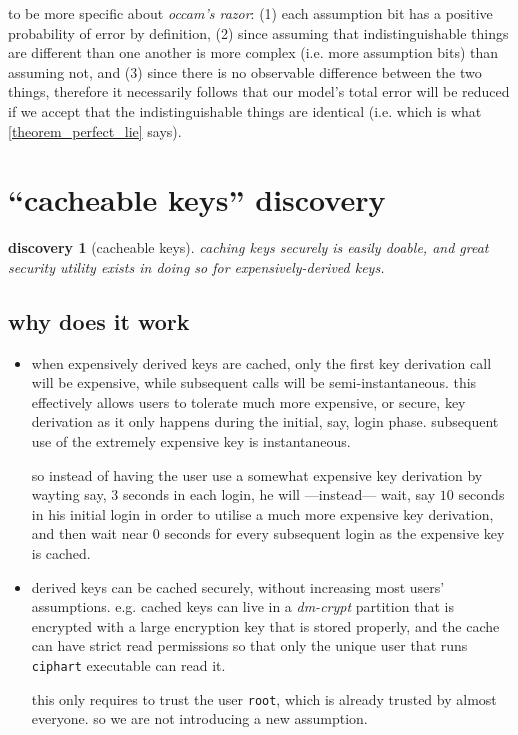 \documentclass[twocolumn]{article}
\newtheorem{discovery}{discovery}
\begin{document}
to be more specific about \emph{occam's razor}: (1) each assumption bit has
a positive probability of error by definition, (2) since assuming that
indistinguishable things are different than one another is more complex
(i.e. more assumption bits) than assuming not, and (3) since there is no
observable difference between the two things, therefore it necessarily
follows that our model's total error will be reduced if we accept that the
indistinguishable things are identical (i.e.  which is what
\cref{theorem_perfect_lie} says).

\section{``cacheable keys'' discovery}
\begin{discovery}[cacheable keys]\label{discov_key_caching}
    caching keys securely is easily doable, and great security utility
    exists in doing so for expensively-derived keys.
\end{discovery}

\subsection{why does it work}
\begin{itemize}
    \item when expensively derived keys are cached, only the first key
    derivation call will be expensive, while subsequent calls will be
    semi-instantaneous.  this effectively allows users to tolerate much
    more expensive, or secure, key derivation as it only happens during the
    initial, say, login phase.  subsequent use of the extremely expensive
    key is instantaneous.

    so instead of having the user use a somewhat expensive key derivation
    by wayting say, $3$ seconds in each login, he will ---instead--- wait,
    say $10$ seconds in his initial login in order to utilise a much more
    expensive key derivation, and then wait near $0$ seconds for every
    subsequent login as the expensive key is cached.

    \item derived keys can be cached securely, without increasing most
    users' assumptions.  e.g. cached keys can live in a \emph{dm-crypt}
    partition that is encrypted with a large encryption key that is stored
    properly, and the cache can have strict read permissions so that only
    the unique user that runs \texttt{ciphart} executable can read it.

    this only requires to trust the user \texttt{root}, which is already
    trusted by almost everyone.  so we are not introducing a new
    assumption.  
\end{itemize}
\end{document}
